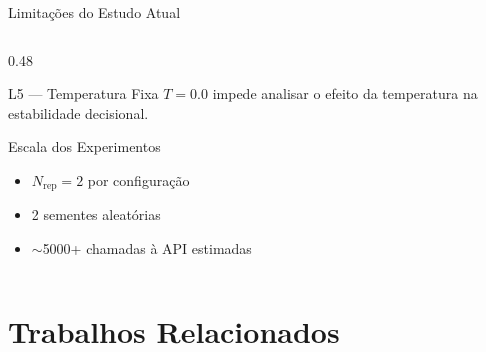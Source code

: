 \documentclass[aspectratio=169, 8pt]{beamer}
\begin{document}
\begin{frame}{Limitações do Estudo Atual}
\begin{columns}[T]
\begin{column}{0.48\textwidth}
      \vspace{0.1em}

      \begin{alertblock}{L5 --- Temperatura Fixa}
        \footnotesize
        $T = 0.0$ impede analisar o efeito da temperatura
        na estabilidade decisional.
      \end{alertblock}

      \vspace{0.1em}

      \begin{block}{Escala dos Experimentos}
        \begin{itemize}
          \footnotesize
          \item $N_{\text{rep}} = 2$ por configuração
          \item 2 sementes aleatórias
          \item $\sim$5000+ chamadas à API estimadas
        \end{itemize}
      \end{block}
    \end{column}
  \end{columns}
\end{frame}

\section{Trabalhos Relacionados}
\end{document}
